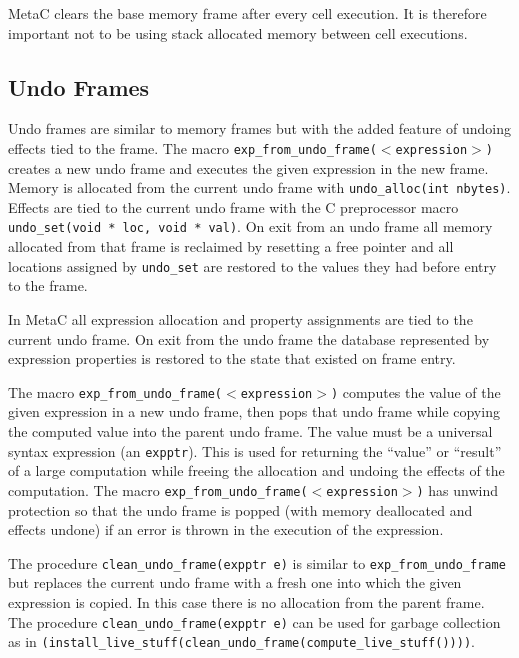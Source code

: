\documentclass{article}
\begin{document}
MetaC clears the base memory frame after every cell execution.
It is therefore important not to be using
stack allocated memory between cell executions.

\subsection{Undo Frames}
\label{sec:undo}
Undo frames are similar to memory frames but with the added feature of undoing effects tied to the frame.
The macro {\tt exp\_from\_undo\_frame($<$expression$>$)} creates a new undo frame and executes the given expression
in the new frame. Memory is allocated from the current undo frame
with {\tt undo\_alloc(int nbytes)}.  Effects are tied to the current undo frame with the C preprocessor macro
{\tt undo\_set(void * loc, void * val)}.  On exit from an undo frame all memory allocated from that frame is reclaimed by resetting a free pointer
and all locations assigned by {\tt undo\_set} are restored to the values they had before entry to the frame.

In MetaC all expression allocation and property assignments are tied to the current undo frame.
On exit from the undo frame the database represented by expression properties is restored to
the state that existed on frame entry.

The macro {\tt exp\_from\_undo\_frame($<$expression$>$)} computes the value of the given expression in a new undo frame, then pops that undo frame while
copying the computed value into the parent undo frame.  The value must be a universal syntax expression
(an {\tt expptr}). This is used for returning the ``value'' or ``result'' of a large computation while freeing the allocation
and undoing the effects of the computation.
The macro {\tt exp\_from\_undo\_frame($<$expression$>$)} has unwind protection so that the undo frame is popped (with memory deallocated and effects undone)
if an error is thrown in the execution of the expression.

The procedure {\tt clean\_undo\_frame(expptr e)} is similar to {\tt exp\_from\_undo\_frame} but replaces the current undo frame with a fresh one
into which the given expression is copied.  In this case there is no allocation from the parent frame.
The procedure {\tt clean\_undo\_frame(expptr e)} can be used for garbage collection
as in {\tt (install\_live\_stuff(clean\_undo\_frame(compute\_live\_stuff())))}.
\end{document}
